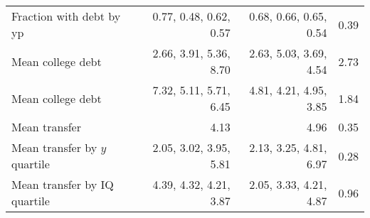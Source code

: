 \begin{tabular}{lrrr}
Fraction with debt by yp & 0.77, 0.48, 0.62, 0.57  & 0.68, 0.66, 0.65, 0.54  & 0.39  \\ 
Mean college debt & 2.66, 3.91, 5.36, 8.70  & 2.63, 5.03, 3.69, 4.54  & 2.73  \\ 
Mean college debt & 7.32, 5.11, 5.71, 6.45  & 4.81, 4.21, 4.95, 3.85  & 1.84  \\ 
Mean transfer & 4.13  & 4.96  & 0.35  \\ 
Mean transfer by $y$ quartile & 2.05, 3.02, 3.95, 5.81  & 2.13, 3.25, 4.81, 6.97  & 0.28  \\ 
Mean transfer by IQ quartile & 4.39, 4.32, 4.21, 3.87  & 2.05, 3.33, 4.21, 4.87  & 0.96  \\ 
\hline
\end{tabular}%
